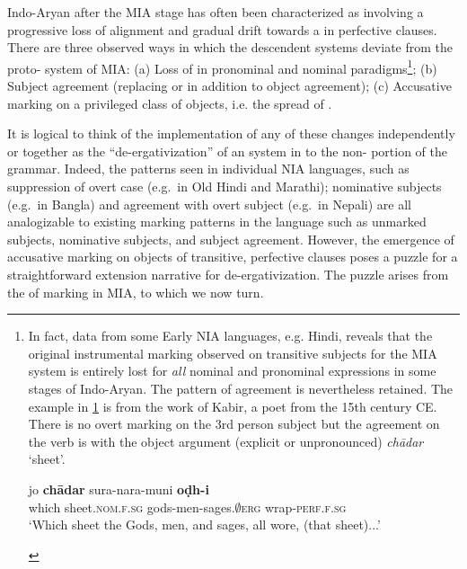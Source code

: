 \documentclass[output=paper,
modfonts
]{LSP/langsci}
\begin{document}
 Indo-Aryan   after the MIA stage  has often been  characterized as involving a progressive loss of   alignment and gradual drift towards a  in perfective clauses.  There are three observed ways in which the  descendent systems deviate from the proto- system of MIA: (a) Loss of   in pronominal and nominal paradigms\footnote{In fact, data from some Early NIA languages, e.g. Hindi, reveals that the original instrumental
marking observed on transitive subjects for the MIA
 system is entirely lost for \textit{all} nominal and pronominal expressions in some stages of Indo-Aryan. The  pattern of agreement is nevertheless retained. The example in \cref{ex:jo} is from the work of Kabir, a poet from the 15th century CE. There is no overt  marking on the 3rd person subject but the agreement on the verb is  with the
 object argument (explicit or unpronounced) \textit{chādar}
`sheet'.

\begin{exe}
\ex\label{ex:jo}\gll jo \textbf{chādar} sura-nara-muni \textbf{oḍh-i} \\ 
which sheet.\textsc{nom.f.sg} gods-men-sages.\textsc{$\emptyset$erg}
wrap-\textsc{perf.f.sg}\\
\glt `Which sheet the  Gods, men, and sages, all wore, (that sheet)...'
\end{exe} 

 }; (b) Subject agreement (replacing or in addition to object agreement); (c) Accusative marking on a privileged class of objects, i.e. the spread of .
 
\largerpage[2]%
It is logical to think of  the implementation of any of these changes independently or together as the ``de-ergativization'' of  an  system in  to the non- portion of the grammar.  Indeed, the patterns seen in individual  NIA languages, such as suppression of overt  case (e.g.\ in Old Hindi and Marathi); nominative subjects (e.g.\ in Bangla) and  agreement with overt  subject (e.g.\ in Nepali) are all analogizable to existing marking patterns in the language such as unmarked subjects,  nominative subjects, and subject agreement. However, the emergence of accusative marking on objects of transitive, perfective clauses poses a puzzle for a straightforward  extension narrative for de-ergativization. The puzzle  arises from the  of  marking in MIA, to which we now turn. 
\end{document}
